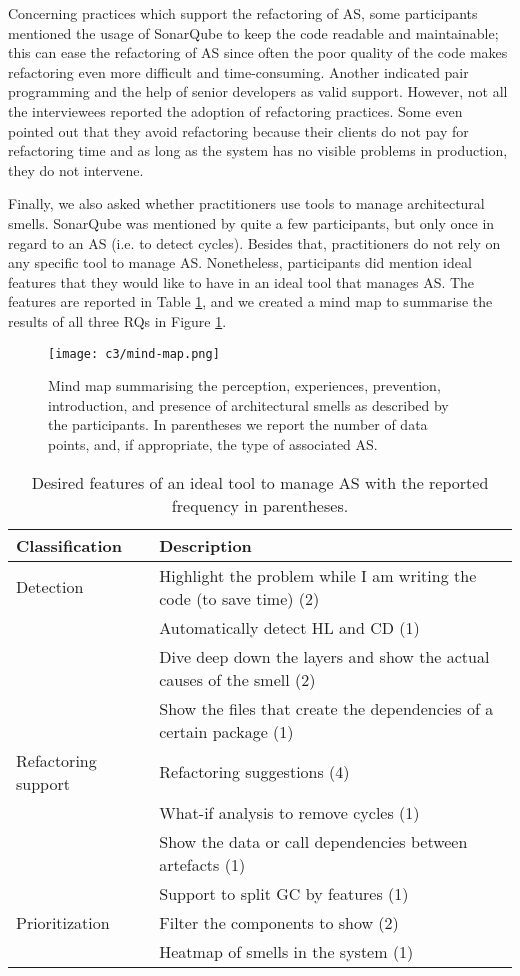 Concerning practices which support the refactoring of AS, some participants mentioned the usage of SonarQube to keep the code readable and maintainable; this can ease the refactoring of AS since often the poor quality of the code makes refactoring even more difficult and time-consuming. Another indicated pair programming and the help of senior developers as valid support. However, not all the interviewees reported the adoption of refactoring practices. Some even pointed out that they avoid refactoring because their clients do not pay for refactoring time and as long as the system has no visible problems in production, they do not intervene.

Finally, we also asked whether practitioners use tools to manage architectural smells. SonarQube was mentioned by quite a few participants, but only once in regard to an AS (i.e. to detect cycles). Besides that, practitioners do not rely on any specific tool to manage AS. Nonetheless, participants did mention ideal features that they would like to have in an ideal tool that manages AS. The features are reported in Table \ref{c3:tab:ideal-features}, and we created a mind map to summarise the results of all three RQs in Figure \ref{fig:c3:mind-map}.

\begin{figure}
	\centering
	\texttt{[image: c3/mind-map.png]}
	\caption{Mind map summarising the perception, experiences, prevention, introduction, and presence of architectural smells as described by the participants. In parentheses we report the number of data points, and, if appropriate, the type of associated AS.}\label{fig:c3:mind-map}
\end{figure}

\begin{table}[h]
    \centering
   \footnotesize
    \caption{Desired features of an ideal tool to manage AS with the reported frequency in parentheses.}
    \label{c3:tab:ideal-features}
    \begin{tabular}{@{}ll@{}}\toprule
    \textbf{Classification} & \textbf{Description} \\ \midrule
    Detection & Highlight the problem while I am writing the code (to save time) (2) \\
     & Automatically detect HL and CD (1) \\
     & Dive deep down the layers and show the actual causes of the smell (2) \\
     & Show the files that create the dependencies of a certain package (1) \\
    Refactoring support & Refactoring suggestions (4) \\
     & What-if analysis to remove cycles (1) \\
     & Show the data or call dependencies between artefacts (1) \\
     & Support to split GC by features (1) \\
    Prioritization & Filter the components to show (2) \\
     & Heatmap of smells in the system (1) \\ \bottomrule
    \end{tabular}
\end{table}

